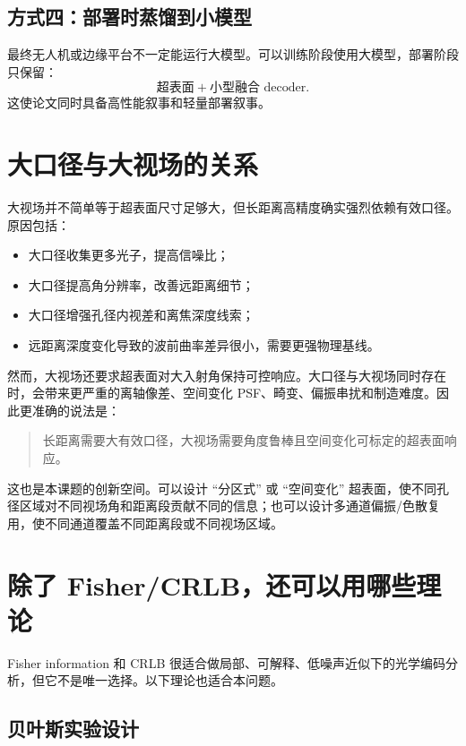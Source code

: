 \documentclass[11pt,a4paper,fontset=none]{ctexart}
\begin{document}
\subsection{方式四：部署时蒸馏到小模型}

最终无人机或边缘平台不一定能运行大模型。可以训练阶段使用大模型，部署阶段只保留：
\begin{equation}
  \text{超表面} + \text{小型融合 decoder}.
\end{equation}
这使论文同时具备高性能叙事和轻量部署叙事。

\section{大口径与大视场的关系}

大视场并不简单等于超表面尺寸足够大，但长距离高精度确实强烈依赖有效口径。原因包括：

\begin{itemize}
  \item 大口径收集更多光子，提高信噪比；
  \item 大口径提高角分辨率，改善远距离细节；
  \item 大口径增强孔径内视差和离焦深度线索；
  \item 远距离深度变化导致的波前曲率差异很小，需要更强物理基线。
\end{itemize}

然而，大视场还要求超表面对大入射角保持可控响应。大口径与大视场同时存在时，会带来更严重的离轴像差、空间变化 PSF、畸变、偏振串扰和制造难度。因此更准确的说法是：

\begin{quote}
长距离需要大有效口径，大视场需要角度鲁棒且空间变化可标定的超表面响应。
\end{quote}

这也是本课题的创新空间。可以设计 ``分区式'' 或 ``空间变化'' 超表面，使不同孔径区域对不同视场角和距离段贡献不同的信息；也可以设计多通道偏振/色散复用，使不同通道覆盖不同距离段或不同视场区域。

\section{除了 Fisher/CRLB，还可以用哪些理论}

Fisher information 和 CRLB 很适合做局部、可解释、低噪声近似下的光学编码分析，但它不是唯一选择。以下理论也适合本问题。

\subsection{贝叶斯实验设计}
\end{document}
